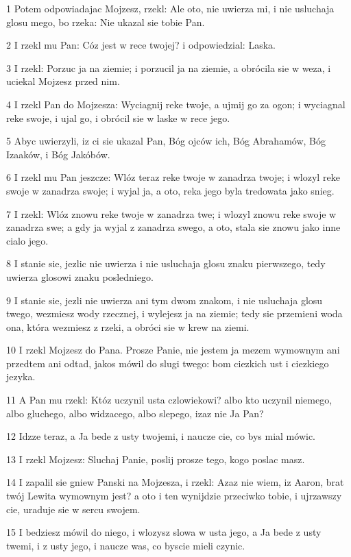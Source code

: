 \par 1 Potem odpowiadajac Mojzesz, rzekl: Ale oto, nie uwierza mi, i nie usluchaja glosu mego, bo rzeka: Nie ukazal sie tobie Pan.
\par 2 I rzekl mu Pan: Cóz jest w rece twojej? i odpowiedzial: Laska.
\par 3 I rzekl: Porzuc ja na ziemie; i porzucil ja na ziemie, a obrócila sie w weza, i uciekal Mojzesz przed nim.
\par 4 I rzekl Pan do Mojzesza: Wyciagnij reke twoje, a ujmij go za ogon; i wyciagnal reke swoje, i ujal go, i obrócil sie w laske w rece jego.
\par 5 Abyc uwierzyli, iz ci sie ukazal Pan, Bóg ojców ich, Bóg Abrahamów, Bóg Izaaków, i Bóg Jakóbów.
\par 6 I rzekl mu Pan jeszcze: Wlóz teraz reke twoje w zanadrza twoje; i wlozyl reke swoje w zanadrza swoje; i wyjal ja, a oto, reka jego byla tredowata jako snieg.
\par 7 I rzekl: Wlóz znowu reke twoje w zanadrza twe; i wlozyl znowu reke swoje w zanadrza swe; a gdy ja wyjal z zanadrza swego, a oto, stala sie znowu jako inne cialo jego.
\par 8 I stanie sie, jezlic nie uwierza i nie usluchaja glosu znaku pierwszego, tedy uwierza glosowi znaku posledniego.
\par 9 I stanie sie, jezli nie uwierza ani tym dwom znakom, i nie usluchaja glosu twego, wezmiesz wody rzecznej, i wylejesz ja na ziemie; tedy sie przemieni woda ona, która wezmiesz z rzeki, a obróci sie w krew na ziemi.
\par 10 I rzekl Mojzesz do Pana. Prosze Panie, nie jestem ja mezem wymownym ani przedtem ani odtad, jakos mówil do slugi twego: bom ciezkich ust i ciezkiego jezyka.
\par 11 A Pan mu rzekl: Któz uczynil usta czlowiekowi? albo kto uczynil niemego, albo gluchego, albo widzacego, albo slepego, izaz nie Ja Pan?
\par 12 Idzze teraz, a Ja bede z usty twojemi, i naucze cie, co bys mial mówic.
\par 13 I rzekl Mojzesz: Sluchaj Panie, poslij prosze tego, kogo poslac masz.
\par 14 I zapalil sie gniew Panski na Mojzesza, i rzekl: Azaz nie wiem, iz Aaron, brat twój Lewita wymownym jest? a oto i ten wynijdzie przeciwko tobie, i ujrzawszy cie, uraduje sie w sercu swojem.
\par 15 I bedziesz mówil do niego, i wlozysz slowa w usta jego, a Ja bede z usty twemi, i z usty jego, i naucze was, co byscie mieli czynic.
